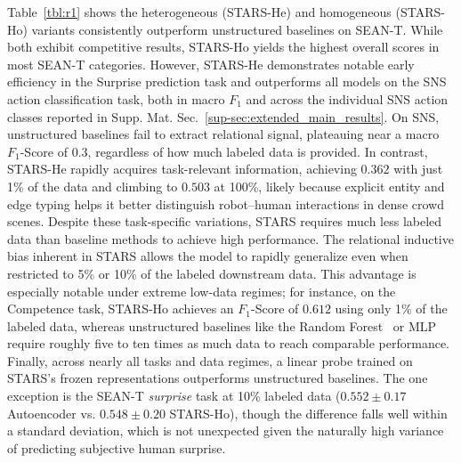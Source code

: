 \documentclass{article}
\newcommand{\method}{STARS\xspace}
\begin{document}
Table~\ref{tbl:r1} shows the heterogeneous (\method-He) and homogeneous (\method-Ho) variants consistently outperform unstructured baselines on SEAN-T.
While both exhibit competitive results, \method-Ho yields the highest overall scores in most SEAN-T categories. 
However, \method-He demonstrates notable early efficiency in the Surprise prediction task and outperforms all models on the SNS action classification task, both in macro $F_1$ and across the individual SNS action classes reported in Supp. Mat. Sec.~\ref{sup-sec:extended_main_results}.
On SNS, unstructured baselines fail to extract relational signal, plateauing near a macro $F_1$-Score of $0.3$, regardless of how much labeled data is provided.
In contrast, \method-He rapidly acquires task-relevant information, achieving $0.362$ with just 1\% of the data and climbing to $0.503$ at 100\%, likely because explicit entity and edge typing helps it better distinguish robot–human interactions in dense crowd scenes.
Despite these task-specific variations, \method requires much less labeled data than baseline methods to achieve high performance.
The relational inductive bias inherent in \method allows the model to rapidly generalize even when restricted to 5\% or 10\% of the labeled downstream data. 
This advantage is especially notable under extreme low-data regimes; for instance, on the Competence task, \method-Ho achieves an $F_1$-Score of $0.612$ using only 1\% of the labeled data, whereas unstructured baselines like the Random Forest~\cite{tsoi2022sean} or MLP require roughly five to ten times as much data to reach comparable performance. 
Finally, across nearly all tasks and data regimes, a linear probe trained on \method's frozen representations outperforms unstructured baselines.
The one exception is the SEAN-T \textit{surprise} task at 10\% labeled data ($0.552 \pm 0.17$ Autoencoder vs. $0.548 \pm 0.20$ \method-Ho), though the difference falls well within a standard deviation, which is not unexpected given the naturally high variance of predicting subjective human surprise.
\end{document}
